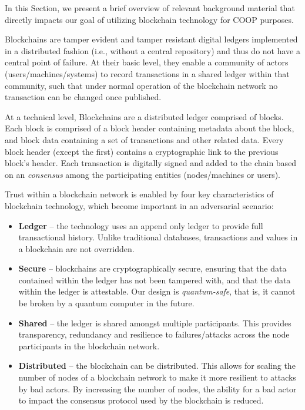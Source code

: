 \label{sec:overview}

In this Section, we present a brief overview of relevant background material that directly impacts our goal of utilizing blockchain
technology for COOP purposes.

Blockchains are tamper evident and tamper resistant digital ledgers implemented in a distributed fashion (i.e., without
a central repository) and thus do not have a central point of failure. At their basic level, they enable a community of
actors (users/machines/systems) to record transactions in a shared ledger within that community, such that under normal
operation of the blockchain network no transaction can be changed once published.

At a technical level, Blockchains are a distributed ledger comprised of blocks. Each block is comprised of a block
header containing metadata about the block, and block data containing a set of transactions and other related data.
Every block header (except the first) contains a cryptographic link to the previous
block’s header. Each transaction is digitally signed and added to the chain based on an {\it consensus} among the
participating entities (nodes/machines or users).

Trust within a blockchain network is enabled by four key characteristics of blockchain technology, which become
important in an adversarial scenario:
\begin{itemize}
\item {\bf Ledger} – the technology uses an append only ledger to provide full transactional history.
Unlike traditional databases, transactions and values in a blockchain are not overridden.
\item {\bf Secure} – blockchains are cryptographically secure, ensuring that the data contained
within the ledger has not been tampered with, and that the data within the ledger is
        attestable. Our design is {\it quantum-safe}, that is, it cannot be broken by a quantum computer in the future.
\item {\bf Shared} – the ledger is shared amongst multiple participants. This provides transparency, redundancy and
    resilience to failures/attacks across the node participants in the blockchain network.
\item {\bf Distributed} – the blockchain can be distributed. This allows for scaling the number of
nodes of a blockchain network to make it more resilient to attacks by bad actors. By
increasing the number of nodes, the ability for a bad actor to impact the consensus
protocol used by the blockchain is reduced.
\end{itemize}

